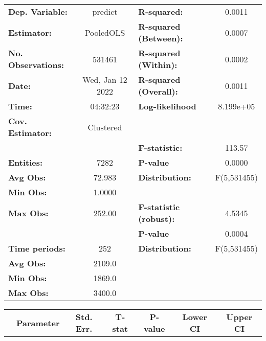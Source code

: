 \begin{center}
\begin{tabular}{lclc}
\toprule
\textbf{Dep. Variable:}    &      predict       & \textbf{  R-squared:         }   &      0.0011      \\
\textbf{Estimator:}        &     PooledOLS      & \textbf{  R-squared (Between):}  &      0.0007      \\
\textbf{No. Observations:} &       531461       & \textbf{  R-squared (Within):}   &      0.0002      \\
\textbf{Date:}             &  Wed, Jan 12 2022  & \textbf{  R-squared (Overall):}  &      0.0011      \\
\textbf{Time:}             &      04:32:23      & \textbf{  Log-likelihood     }   &    8.199e+05     \\
\textbf{Cov. Estimator:}   &     Clustered      & \textbf{                     }   &                  \\
\textbf{}                  &                    & \textbf{  F-statistic:       }   &      113.57      \\
\textbf{Entities:}         &        7282        & \textbf{  P-value            }   &      0.0000      \\
\textbf{Avg Obs:}          &       72.983       & \textbf{  Distribution:      }   &   F(5,531455)    \\
\textbf{Min Obs:}          &       1.0000       & \textbf{                     }   &                  \\
\textbf{Max Obs:}          &       252.00       & \textbf{  F-statistic (robust):} &      4.5345      \\
\textbf{}                  &                    & \textbf{  P-value            }   &      0.0004      \\
\textbf{Time periods:}     &        252         & \textbf{  Distribution:      }   &   F(5,531455)    \\
\textbf{Avg Obs:}          &       2109.0       & \textbf{                     }   &                  \\
\textbf{Min Obs:}          &       1869.0       & \textbf{                     }   &                  \\
\textbf{Max Obs:}          &       3400.0       & \textbf{                     }   &                  \\
\bottomrule
\end{tabular}
\begin{tabular}{lcccccc}
                & \textbf{Parameter} & \textbf{Std. Err.} & \textbf{T-stat} & \textbf{P-value} & \textbf{Lower CI} & \textbf{Upper CI}  \\

\end{tabular}
\end{center}
